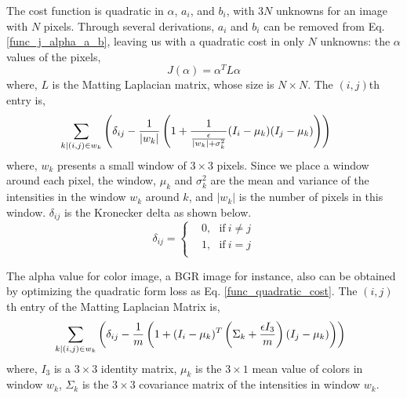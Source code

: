\documentclass[journal]{IEEEtran}
\begin{document}
The cost function is quadratic in $\alpha$, $a_i$, and $b_i$, with $3N$ unknowns for an image with $N$ pixels. Through several derivations, $a_i$ and $b_i$ can be removed from Eq. \ref{func_j_alpha_a_b}, leaving us with a quadratic cost in only $N$ unknowns: the $\alpha$ values of the pixels,
\begin{equation}
    J(\alpha) = \alpha^T L \alpha
    \label{func_quadratic_cost}
\end{equation}
where, $L$ is the Matting Laplacian matrix, whose size is $N\times N$. The $(i,j)$th entry is,
\begin{equation}
    \hspace*{-0.5cm}
    \sum\limits_{k|(i,j)\in w_k} \left( \delta_{ij} - \frac{1}{|w_k|} \left( 1 + \frac{1}{\frac{\epsilon}{|w_k| + \sigma_k^2}} (I_i - \mu_k) (I_j - \mu_k) \right) \right)
    \label{laplacian_entry}
\end{equation}
where, $w_k$ presents a small window of $3\times 3$ pixels. Since we place a window around each pixel, the window, $\mu_k$ and $\sigma_k^2$ are the mean and variance of the intensities in the window $w_k$ around $k$, and $|w_k|$ is the number of pixels in this window. $\delta_{ij}$ is the Kronecker delta as shown below.
\begin{equation}
    \delta_{ij} = \left \{
        \begin{aligned}
            &0,~~~\text{if}~i \neq j \\
            &1,~~~\text{if}~i = j \\
        \end{aligned}
    \right .
    \label{Kronecker delta}
\end{equation}

The alpha value for color image, a BGR image for instance, also can be obtained by optimizing the quadratic form loss as Eq. \ref{func_quadratic_cost}. The $(i,j)$th entry of the Matting Laplacian Matrix is,
\begin{equation}
    \hspace*{-0.2cm}
    \sum\limits_{k|(i,j)\in w_k} \left( \delta_{ij} - \frac{1}{m} \left( 1 + (I_i - \mu_k)^T \left( \Sigma_k + \frac{\epsilon I_{3}}{m} \right) (I_j - \mu_k)  \right) \right)
    \label{laplacian_entry_bgr}
\end{equation}
where, $I_3$ is a $3\times 3$ identity matrix, $\mu_k$ is the $3\times 1$ mean value of colors in window $w_k$, $\Sigma_k$ is the $3\times 3$ covariance matrix of the intensities in window $w_k$. 
\end{document}
